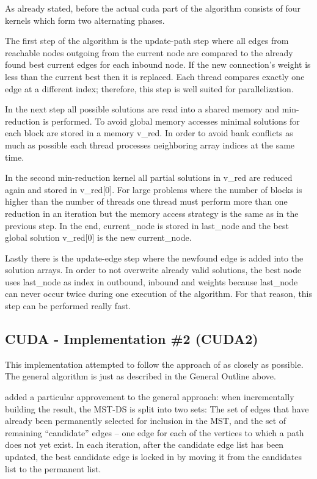 \documentclass[sigconf,nonacm]{acmart}
\begin{document}
As already stated, before the actual cuda part of the algorithm consists of four kernels which form two alternating phases.

The first step of the algorithm is the update-path step where all edges from reachable nodes outgoing from the current node are compared to the already found best current edges for each inbound node. If the new connection’s weight is less than the current best then it is replaced. Each thread compares exactly one edge at a different index; therefore, this step is well suited for parallelization.

In the next step all possible solutions are read into a shared memory and min-reduction is performed. To avoid global memory accesses minimal solutions for each block are stored in a memory v\_red. In order to avoid bank conflicts as much as possible each thread processes neighboring array indices at the same time.

In the second min-reduction kernel all partial solutions in v\_red are reduced again and stored in v\_red[0]. For large problems where the number of blocks is higher than the number of threads one thread must perform more than one reduction in an iteration but the memory access strategy is the same as in the previous step. In the end, current\_node is stored in last\_node and the best global solution v\_red[0] is the new current\_node.

Lastly there is the update-edge step where the newfound edge is added into the solution arrays. In order to not overwrite already valid solutions, the best node uses last\_node as index in outbound, inbound and weights because last\_node can never occur twice during one execution of the algorithm. For that reason, this step can be performed really fast.


\subsection{CUDA - Implementation \#2 (CUDA2)}


This implementation attempted to follow the approach of \cite{wang2011design} as closely as possible. The general algorithm is just as described in the General Outline above.

\cite{wang2011design} added a particular approvement to the general approach: when incrementally building the result, the MST-DS is split into two sets: The set of edges that have already been permanently selected for inclusion in the MST, and the set of remaining “candidate” edges -- one edge for each of the vertices to which a path does not yet exist. In each iteration, after the candidate edge list has been updated, the best candidate edge is locked in by moving it from the candidates list to the permanent list.
\end{document}
